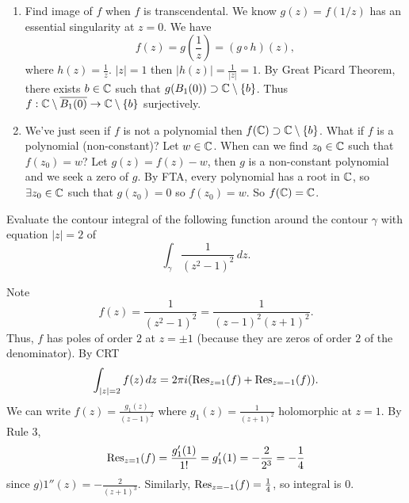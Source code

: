 \documentclass[10pt, a4paper]{article}
\begin{document}
\begin{problem}
\begin{solution}
\begin{enumerate}[label = (\roman*)]
            \item Find image of $f$ when $f$ is transcendental.
            We know $g(z) = f(1 / z)$ has an essential singularity at $z = 0$.
            We have
            \[
            f(z) = g\left(\frac{1}{z}\right) = (g\circ h)(z),
            \]
            where $h(z) = \frac{1}{z}$.
            $|z| = 1$ then $|h(z)| = \frac{1}{|z|} = 1$.
            By Great Picard Theorem,
            there exists $b \in \mathbb{C}$ such that $g(B_1(0)) \supset \mathbb{C} \setminus \{b\}$.
            Thus $f : \mathbb{C} \setminus \overline{B_1(0)} \to \mathbb{C} \setminus \{b\}$ surjectively.

            \item We've just seen if $f$ is not a polynomial then $f(\mathbb{C}) \supset \mathbb{C} \setminus \{b\}$.
            What if $f$ is a polynomial
            (non-constant)?
            Let $w \in \mathbb{C}$.
            When can we find $z_0 \in \mathbb{C}$ such that $f(z_0) = w$?
            Let $g(z) = f(z) - w$,
            then $g$ is a non-constant polynomial and we seek a zero of $g$.
            By FTA,
            every polynomial has a root in $\mathbb{C}$,
            so $\exists z_0 \in \mathbb{C}$ such that $g(z_0) = 0$ so $f(z_0) = w$.
            So $f(\mathbb{C}) = \mathbb{C}$.
        \end{enumerate}
    \end{solution}
\end{problem}

\begin{problem}
    Evaluate the contour integral of the following function around the contour $\gamma$ with equation $|z| = 2$ of
    \[
    \int_{\gamma}\frac{1}{(z ^ 2 - 1) ^ 2}\,dz.
    \]

    \begin{solution}
        Note
        \[
        f(z) = \frac{1}{(z ^ 2 - 1) ^ 2} = \frac{1}{(z - 1) ^ 2(z + 1) ^ 2}.
        \]
        Thus,
        $f$ has poles of order $2$ at $z = \pm 1$
        (because they are zeros of order $2$ of the denominator).
        By CRT
        \[
        \int_{|z| = 2}f(z)\,dz = 2\pi i(\operatorname{Res}_{z = 1}(f) + \operatorname{Res}_{z = -1}(f)).
        \]
        We can write $f(z) = \frac{g_1(z)}{(z - 1) ^ 2}$ where $g_1(z) = \frac{1}{(z + 1) ^ 2}$ holomorphic at $z = 1$.
        By Rule $3$,
        \[
        \operatorname{Res}_{z = 1}(f) = \frac{g_1'(1)}{1!} = g_1'(1) =  -\frac{2}{2 ^ 3} = -\frac{1}{4}
        \]
        since $g)1''(z) = -\frac{2}{(z + 1) ^ 3}$.
        Similarly,
        $\operatorname{Res}_{z = -1}(f) = \frac{1}{4}$,
        so integral is $0$.
    \end{solution}
\end{problem}
\end{document}
